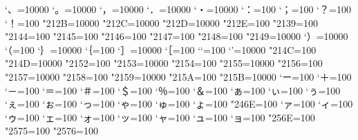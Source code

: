 %
\prebreakpenalty`、=10000
\prebreakpenalty`。=10000
\prebreakpenalty`，=10000
\prebreakpenalty`．=10000
\prebreakpenalty`・=10000
\prebreakpenalty`：=100
\prebreakpenalty`；=100
\prebreakpenalty`？=100
\prebreakpenalty`！=100
\prebreakpenalty\jis"212B=10000%
\prebreakpenalty\jis"212C=10000%
\prebreakpenalty\jis"212D=10000%
\postbreakpenalty\jis"212E=100%
\prebreakpenalty\jis"2139=100%
\prebreakpenalty\jis"2144=100%
\prebreakpenalty\jis"2145=100%
\postbreakpenalty\jis"2146=100%
\prebreakpenalty\jis"2147=100%
\postbreakpenalty\jis"2148=100%
\prebreakpenalty\jis"2149=10000%
\prebreakpenalty`）=10000
\postbreakpenalty`（=100
\prebreakpenalty`｝=10000
\postbreakpenalty`｛=100
\prebreakpenalty`］=10000
\postbreakpenalty`［=100
\postbreakpenalty`‘=100
\prebreakpenalty`’=10000
\postbreakpenalty\jis"214C=100%
\prebreakpenalty\jis"214D=10000%
\postbreakpenalty\jis"2152=100%
\prebreakpenalty\jis"2153=10000%
\postbreakpenalty\jis"2154=100%
\prebreakpenalty\jis"2155=10000%
\postbreakpenalty\jis"2156=100%
\prebreakpenalty\jis"2157=10000%
\postbreakpenalty\jis"2158=100%
\prebreakpenalty\jis"2159=10000%
\postbreakpenalty\jis"215A=100%
\prebreakpenalty\jis"215B=10000%
\prebreakpenalty`ー=100
\prebreakpenalty`＋=100
\prebreakpenalty`－=100
\prebreakpenalty`＝=100
\postbreakpenalty`＃=100
\postbreakpenalty`＄=100
\postbreakpenalty`％=100
\postbreakpenalty`＆=100
\prebreakpenalty`ぁ=100
\prebreakpenalty`ぃ=100
\prebreakpenalty`ぅ=100
\prebreakpenalty`ぇ=100
\prebreakpenalty`ぉ=100
\prebreakpenalty`っ=100
\prebreakpenalty`ゃ=100
\prebreakpenalty`ゅ=100
\prebreakpenalty`ょ=100
\prebreakpenalty\jis"246E=100%
\prebreakpenalty`ァ=100
\prebreakpenalty`ィ=100
\prebreakpenalty`ゥ=100
\prebreakpenalty`ェ=100
\prebreakpenalty`ォ=100
\prebreakpenalty`ッ=100
\prebreakpenalty`ャ=100
\prebreakpenalty`ュ=100
\prebreakpenalty`ョ=100
\prebreakpenalty\jis"256E=100%
\prebreakpenalty\jis"2575=100%
\prebreakpenalty\jis"2576=100%
%
\endinput
